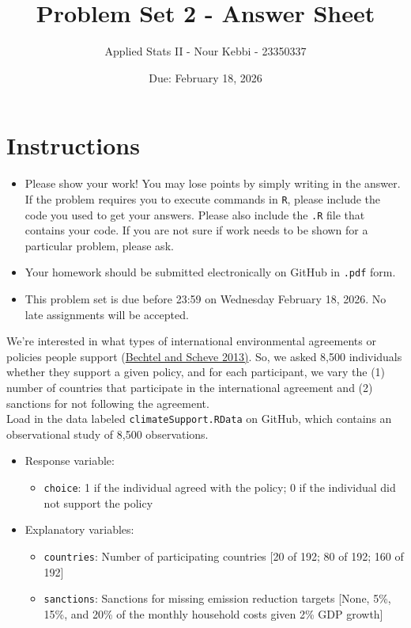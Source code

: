 \documentclass[12pt,letterpaper]{article}
\title{Problem Set 2 - Answer Sheet}
\date{Due: February 18, 2026}
\author{Applied Stats II - Nour Kebbi - 23350337}
\begin{document}
	\maketitle
	\section*{Instructions}
	\begin{itemize}
		\item Please show your work! You may lose points by simply writing in the answer. If the problem requires you to execute commands in \texttt{R}, please include the code you used to get your answers. Please also include the \texttt{.R} file that contains your code. If you are not sure if work needs to be shown for a particular problem, please ask.
		\item Your homework should be submitted electronically on GitHub in \texttt{.pdf} form.
		\item This problem set is due before 23:59 on Wednesday February 18, 2026. No late assignments will be accepted.

	\end{itemize}

	\vspace{.25cm}

\noindent We're interested in what types of international environmental agreements or policies people support (\href{https://www.pnas.org/content/110/34/13763}{Bechtel and Scheve 2013)}. So, we asked 8,500 individuals whether they support a given policy, and for each participant, we vary the (1) number of countries that participate in the international agreement and (2) sanctions for not following the agreement. \\

\noindent Load in the data labeled \texttt{climateSupport.RData} on GitHub, which contains an observational study of 8,500 observations.

\begin{itemize}
	\item
	Response variable: 
	\begin{itemize}
		\item \texttt{choice}: 1 if the individual agreed with the policy; 0 if the individual did not support the policy
	\end{itemize}
	\item
	Explanatory variables: 
	\begin{itemize}
		\item
		\texttt{countries}: Number of participating countries [20 of 192; 80 of 192; 160 of 192]
		\item
		\texttt{sanctions}: Sanctions for missing emission reduction targets [None, 5\%, 15\%, and 20\% of the monthly household costs given 2\% GDP growth]
		
	\end{itemize}
	
\end{itemize}
\end{document}
